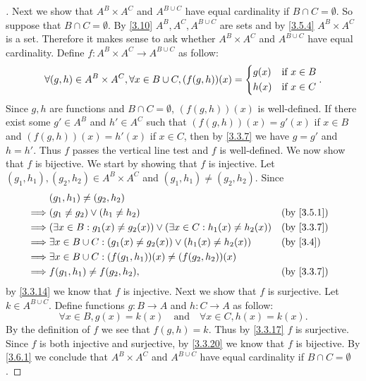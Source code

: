 \begin{proof}[]
	Next we show that \(A^B \times A^C\) and \(A^{B \cup C}\) have equal cardinality if \(B \cap C = \emptyset\).
	So suppose that \(B \cap C = \emptyset\).
	By \cref{3.10} \(A^B, A^C, A^{B \cup C}\) are sets and by \cref{3.5.4} \(A^B \times A^C\) is a set.
	Therefore it makes sense to ask whether \(A^B \times A^C\) and \(A^{B \cup C}\) have equal cardinality.
	Define \(f : A^B \times A^C \to A^{B \cup C}\) as follow:
	\[
		\forall (g, h) \in A^B \times A^C, \forall x \in B \cup C, (f(g, h))(x) = \begin{dcases}
			g(x) & \text{if } x \in B \\
			h(x) & \text{if } x \in C
		\end{dcases}.
	\]
	Since \(g, h\) are functions and \(B \cap C = \emptyset\), \((f(g, h))(x)\) is well-defined.
	If there exist some \(g' \in A^B\) and \(h' \in A^C\) such that \((f(g, h))(x) = g'(x)\) if \(x \in B\) and \((f(g, h))(x) = h'(x)\) if \(x \in C\), then by \cref{3.3.7} we have \(g = g'\) and \(h = h'\).
	Thus \(f\) passes the vertical line test and \(f\) is well-defined.
	We now show that \(f\) is bijective.
	We start by showing that \(f\) is injective.
	Let \((g_1, h_1), (g_2, h_2) \in A^B \times A^C\) and \((g_1, h_1) \neq (g_2, h_2)\).
	Since
	\begin{align*}
		         & (g_1, h_1) \neq (g_2, h_2)                                                                         \\
		\implies & (g_1 \neq g_2) \lor (h_1 \neq h_2)                                                 &  & \by{3.5.1} \\
		\implies & (\exists x \in B : g_1(x) \neq g_2(x)) \lor (\exists x \in C : h_1(x) \neq h_2(x)) &  & \by{3.3.7} \\
		\implies & \exists x \in B \cup C : (g_1(x) \neq g_2(x)) \lor (h_1(x) \neq h_2(x))            &  & \by{3.4}   \\
		\implies & \exists x \in B \cup C : (f(g_1, h_1))(x) \neq (f(g_2, h_2))(x)                                    \\
		\implies & f(g_1, h_1) \neq f(g_2, h_2),                                                      &  & \by{3.3.7}
	\end{align*}
	by \cref{3.3.14} we know that \(f\) is injective.
	Next we show that \(f\) is surjective.
	Let \(k \in A^{B \cup C}\).
	Define functions \(g : B \to A\) and \(h : C \to A\) as follow:
	\[
		\forall x \in B, g(x) = k(x) \quad \text{and} \quad \forall x \in C, h(x) = k(x).
	\]
	By the definition of \(f\) we see that \(f(g, h) = k\).
	Thus by \cref{3.3.17} \(f\) is surjective.
	Since \(f\) is both injective and surjective, by \cref{3.3.20} we know that \(f\) is bijective.
	By \cref{3.6.1} we conclude that \(A^B \times A^C\) and \(A^{B \cup C}\) have equal cardinality if \(B \cap C = \emptyset\).


\end{proof}
